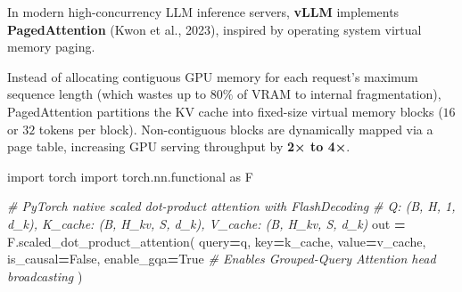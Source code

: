 \documentclass[
  letterpaper,
]{scrbook}
\newenvironment{Shaded}{\begin{snugshade}}{\end{snugshade}}
\newcommand{\CommentTok}[1]{\textcolor[rgb]{0.56,0.35,0.01}{\textit{#1}}}
\newcommand{\ImportTok}[1]{#1}
\newcommand{\NormalTok}[1]{#1}
\newcommand{\OperatorTok}[1]{\textcolor[rgb]{0.81,0.36,0.00}{\textbf{#1}}}
\newcommand{\VariableTok}[1]{\textcolor[rgb]{0.00,0.00,0.00}{#1}}
\begin{document}
\begin{tcolorbox}[enhanced jigsaw, arc=.35mm, bottomrule=.15mm, bottomtitle=1mm, breakable, colback=white, colbacktitle=quarto-callout-note-color!10!white, colframe=quarto-callout-note-color-frame, coltitle=black, left=2mm, leftrule=.75mm, opacityback=0, opacitybacktitle=0.6, rightrule=.15mm, title=\textcolor{quarto-callout-note-color}{\faInfo}\hspace{0.5em}{Production Systems Bridge: vLLM, PagedAttention, and FlashDecoding}, titlerule=0mm, toprule=.15mm, toptitle=1mm]

In modern high-concurrency LLM inference servers, \textbf{vLLM}
implements \textbf{PagedAttention} (Kwon et al., 2023), inspired by
operating system virtual memory paging.\footnotemark{}

Instead of allocating contiguous GPU memory for each request's maximum
sequence length (which wastes up to \(80\%\) of VRAM to internal
fragmentation), PagedAttention partitions the KV cache into fixed-size
virtual memory blocks (\(16\) or \(32\) tokens per block).
Non-contiguous blocks are dynamically mapped via a page table,
increasing GPU serving throughput by \textbf{2× to 4×}.

\begin{Shaded}
\begin{Highlighting}[]
\ImportTok{import}\NormalTok{ torch}
\ImportTok{import}\NormalTok{ torch.nn.functional }\ImportTok{as}\NormalTok{ F}

\CommentTok{\# PyTorch native scaled dot{-}product attention with FlashDecoding}
\CommentTok{\# Q: (B, H, 1, d\_k), K\_cache: (B, H\_kv, S, d\_k), V\_cache: (B, H\_kv, S, d\_k)}
\NormalTok{out }\OperatorTok{=}\NormalTok{ F.scaled\_dot\_product\_attention(}
\NormalTok{    query}\OperatorTok{=}\NormalTok{q,}
\NormalTok{    key}\OperatorTok{=}\NormalTok{k\_cache,}
\NormalTok{    value}\OperatorTok{=}\NormalTok{v\_cache,}
\NormalTok{    is\_causal}\OperatorTok{=}\VariableTok{False}\NormalTok{,}
\NormalTok{    enable\_gqa}\OperatorTok{=}\VariableTok{True}  \CommentTok{\# Enables Grouped{-}Query Attention head broadcasting}
\NormalTok{)}
\end{Highlighting}
\end{Shaded}

\end{tcolorbox}

\end{document}

